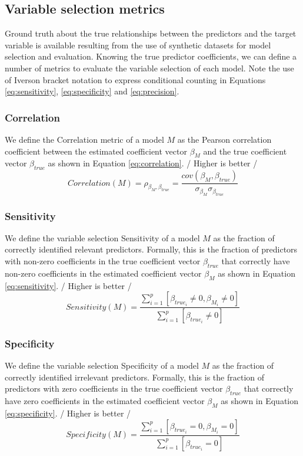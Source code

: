 \subsection{Variable selection metrics} \label{sec:varsel}
Ground truth about the true relationships between the predictors and the target variable is available resulting from the use of synthetic datasets for model selection and evaluation. Knowing the true predictor coefficients, we can define a number of metrics to evaluate the variable selection of each model. Note the use of Iverson bracket notation to express conditional counting in Equations \ref{eq:sensitivity}, \ref{eq:specificity} and \ref{eq:precision}.

\subsubsection{Correlation}
We define the Correlation metric of a model $M$ as the Pearson correlation coefficient between the estimated coefficient vector $\beta_M$ and the true coefficient vector $\beta_{true}$ as shown in Equation \ref{eq:correlation}. / Higher is better /
\begin{equation} \label{eq:correlation}
Correlation(M) = \rho_{\beta_M,\beta_{true}} = \frac{cov(\beta_M,\beta_{true})}{\sigma_{\beta_M} \sigma_{\beta_{true}}}
\end{equation}

\subsubsection{Sensitivity}
We define the variable selection Sensitivity of a model $M$ as the fraction of correctly identified relevant predictors. Formally, this is the fraction of predictors with non-zero coefficients in the true coefficient vector $\beta_{true}$ that correctly have non-zero coefficients in the estimated coefficient vector $\beta_M$ as shown in Equation \ref{eq:sensitivity}. / Higher is better /
\begin{equation} \label{eq:sensitivity}
Sensitivity(M) = \frac{\sum_{i=1}^{p}[\beta_{true_i} \ne 0, \beta_{M_i} \ne 0]}{\sum_{i=1}^{p}[\beta_{true_i} \ne 0]}
\end{equation}

\subsubsection{Specificity}
We define the variable selection Specificity of a model $M$ as the fraction of correctly identified irrelevant predictors. Formally, this is the fraction of predictors with zero coefficients in the true coefficient vector $\beta_{true}$ that correctly have zero coefficients in the estimated coefficient vector $\beta_M$ as shown in Equation \ref{eq:specificity}. / Higher is better /
\begin{equation} \label{eq:specificity}
Specificity(M) = \frac{\sum_{i=1}^{p}[\beta_{true_i} = 0, \beta_{M_i} = 0]}{\sum_{i=1}^{p}[\beta_{true_i} = 0]}
\end{equation}

